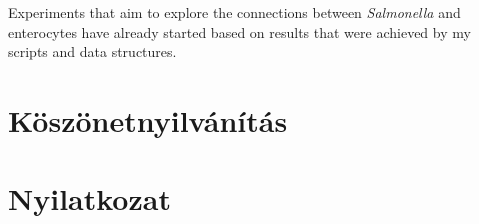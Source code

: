 \documentclass[a4paper,12pt]{article}
\begin{document}
		\vspace{22pt} 
		
		Experiments that aim to explore the connections between \textit{Salmonella} and enterocytes have already started based on results that were achieved by my scripts and data structures.
				
		\pagebreak

\section{Köszönetnyilvánítás}

\section{Nyilatkozat}

\pagebreak


\printbibliography[title={Felhasznált irodalom},heading=bibintoc,type=article]

\printbibliography[title={Internetes hivatkozások},heading=bibintoc,type=misc]
\end{document}
